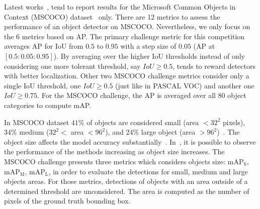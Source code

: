 Latest works~\cite{He2017mask}, tend to report results for the Microsoft Common Objects in Context (MSCOCO) dataset~\cite{MSCOCO2014} only.
There are 12 metrics to assess the performance of an object detector on MSCOCO.
Nevertheless, we only focus on the 6 metrics based on AP.
The primary challenge metric for this competition averages AP for IoU from $0.5$ to $0.95$ with a step size of $0.05$ (AP at $[0.5:0.05:0.95]$).
By averaging over the higher IoU thresholds instead of only considering one more tolerant threshold, say $IoU \geq 0.5$, tends to reward detectors with better localization.
Other two MSCOCO challenge metrics consider only a single IoU threshold, one $IoU \geq 0.5$ (just like in PASCAL VOC) and another one $IoU \geq 0.75$.
For the MSCOCO challenge, the AP is averaged over all 80 object categories to compute mAP.

In MSCOCO dataset $41\%$ of objects are considered small (area $< 32^2$ pixels), $34\%$  medium ($32^2 < $ area $< 96^2$), and $24\%$  large object (area $> 96^2$)~\cite{MSCOCO2014}.
The object size affects the model accuracy substantially~\cite{Everingham10}.
In~\cite{Everingham10, He2017mask}, it is possible to observe the performance of the methods increasing as object size increases.
The MSCOCO challenge presents three metrics which considers objects size: mAP$_{\textrm{S}}$, mAP$_{\textrm{M}}$, mAP$_{\textrm{L}}$, in order to evaluate the detections for small, medium and large objects areas.
For those metrics, detections of objects with an area outside of a determined threshold are unconsidered.
The area is computed as the number of pixels of the ground truth bounding box.

%

